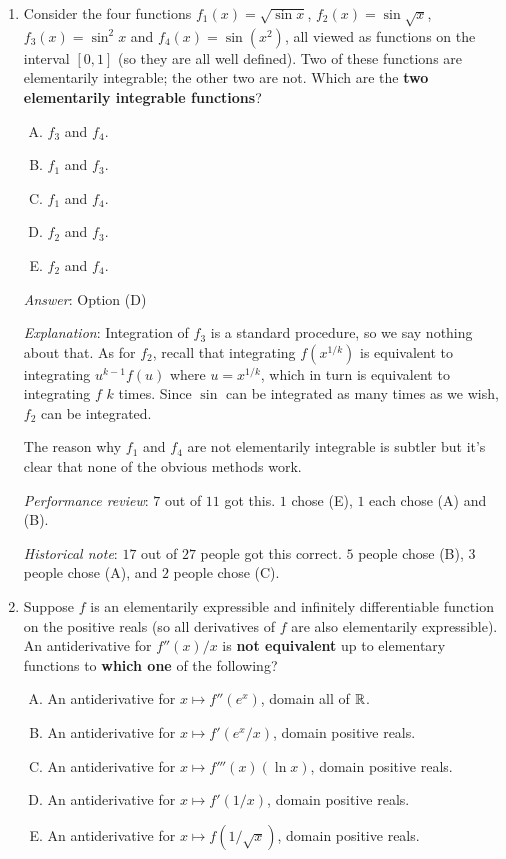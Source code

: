 \documentclass[10pt]{amsart}
\begin{document}
\begin{enumerate}
  {\em Performance review}: $10$ out of $11$ got this. $1$ chos e(D).

  {\em Historical note}: $22$ out of $27$ people got this
  correct. $4$ people chose (E), and $1$ person chose (D).


\item Consider the four functions $f_1(x) = \sqrt{\sin x}$, $f_2(x) =
  \sin \sqrt{x}$, $f_3(x) = \sin^2 x$ and $f_4(x) = \sin(x^2)$, all
  viewed as functions on the interval $[0,1]$ (so they are all well
  defined). Two of these functions are elementarily integrable; the
  other two are not. Which are the {\bf two elementarily integrable
  functions}?

  \begin{enumerate}[(A)]
  \item $f_3$ and $f_4$.
  \item $f_1$ and $f_3$.
  \item $f_1$ and $f_4$. 
  \item $f_2$ and $f_3$.
  \item $f_2$ and $f_4$.
  \end{enumerate}

  {\em Answer}: Option (D)

  {\em Explanation}: Integration of $f_3$ is a standard procedure, so
  we say nothing about that. As for $f_2$, recall that integrating
  $f(x^{1/k})$ is equivalent to integrating $u^{k-1}f(u)$ where $u =
  x^{1/k}$, which in turn is equivalent to integrating $f$ $k$
  times. Since $\sin$ can be integrated as many times as we wish,
  $f_2$ can be integrated.

  The reason why $f_1$ and $f_4$ are not elementarily integrable is
  subtler but it's clear that none of the obvious methods work.

  {\em Performance review}: $7$ out of $11$ got this. $1$ chose (E),
  $1$ each chose (A) and (B).

  {\em Historical note}: $17$ out of $27$ people got this
  correct. $5$ people chose (B), $3$ people chose (A), and $2$ people
  chose (C).
\item Suppose $f$ is an elementarily expressible and infinitely
  differentiable function on the positive reals (so all derivatives of
  $f$ are also elementarily expressible). An antiderivative for
  $f''(x)/x$ is {\bf not equivalent} up to elementary functions to
  {\bf which one} of the following?

  \begin{enumerate}[(A)]
  \item An antiderivative for $x \mapsto f''(e^x)$, domain all of $\mathbb{R}$.
  \item An antiderivative for $x \mapsto f'(e^x/x)$, domain positive reals.
  \item An antiderivative for $x \mapsto f'''(x)(\ln x)$, domain positive
    reals.
  \item An antiderivative for $x \mapsto f'(1/x)$, domain positive
    reals.
  \item An antiderivative for $x \mapsto f(1/\sqrt{x})$, domain positive reals.
  \end{enumerate}


\end{enumerate}
\end{document}
